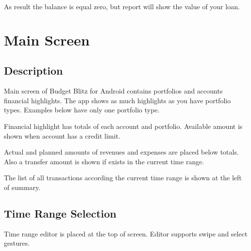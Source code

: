 \documentclass[a4paper,10pt,english]{sphinxmanual}
\begin{document}
As result the balance is equal zero, but  report will show the value of your loan.


\chapter{Main Screen}
\label{\detokenize{main-screen:main-screen}}\label{\detokenize{main-screen:chapter-main-screen}}\label{\detokenize{main-screen::doc}}

\section{Description}
\label{\detokenize{main-screen:description}}
Main screen of Budget Blitz for Android contains portfolios and accounts financial highlights. The app shows
as much highlights as you have portfolio types. Examples below have only one  portfolio type.

Financial highlight has totals of each account and portfolio. Available amount is shown when account
has a credit limit.

Actual and planned amounts of revenues and expenses are placed below totals. Also a transfer amount is shown
if exists in the current time range.

\noindent{}

\noindent{}

\noindent{}

The list of all transactions according the current time range is shown at the left of summary.


\section{Time Range Selection}
\label{\detokenize{main-screen:time-range-selection}}
Time range editor is placed at the top of screen. Editor supports swipe and select gestures.

\noindent{}

\noindent{}

\noindent{}
\end{document}
